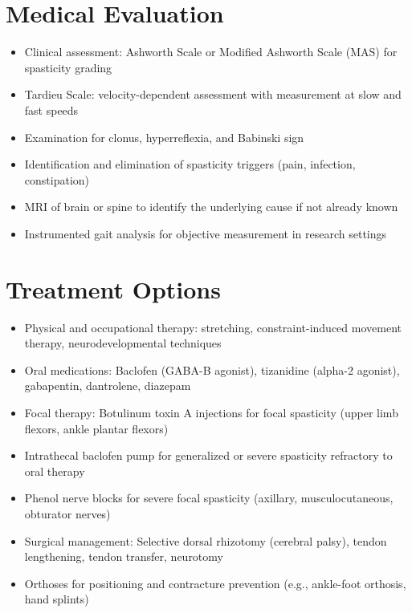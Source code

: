 \section*{Medical Evaluation}
\begin{itemize}
  \item Clinical assessment: Ashworth Scale or Modified Ashworth Scale (MAS) for spasticity grading
  \item Tardieu Scale: velocity-dependent assessment with measurement at slow and fast speeds
  \item Examination for clonus, hyperreflexia, and Babinski sign
  \item Identification and elimination of spasticity triggers (pain, infection, constipation)
  \item MRI of brain or spine to identify the underlying cause if not already known
  \item Instrumented gait analysis for objective measurement in research settings
\end{itemize}

\section*{Treatment Options}
\begin{itemize}
  \item Physical and occupational therapy: stretching, constraint-induced movement therapy, neurodevelopmental techniques
  \item Oral medications: Baclofen (GABA-B agonist), tizanidine (alpha-2 agonist), gabapentin, dantrolene, diazepam
  \item Focal therapy: Botulinum toxin A injections for focal spasticity (upper limb flexors, ankle plantar flexors)
  \item Intrathecal baclofen pump for generalized or severe spasticity refractory to oral therapy
  \item Phenol nerve blocks for severe focal spasticity (axillary, musculocutaneous, obturator nerves)
  \item Surgical management: Selective dorsal rhizotomy (cerebral palsy), tendon lengthening, tendon transfer, neurotomy
  \item Orthoses for positioning and contracture prevention (e.g., ankle-foot orthosis, hand splints)
\end{itemize}


